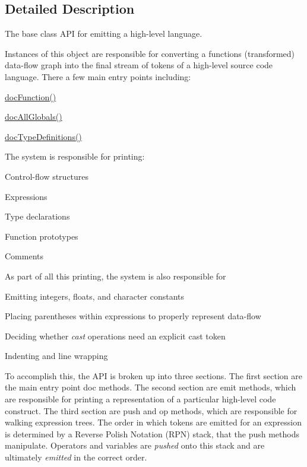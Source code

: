 \subsection{Detailed Description}
The base class A\+PI for emitting a high-\/level language. 

Instances of this object are responsible for converting a function\textquotesingle{}s (transformed) data-\/flow graph into the final stream of tokens of a high-\/level source code language. There a few main entry points including\+:
\begin{DoxyItemize}
\item \mbox{\hyperlink{class_print_language_a93ebbf4cf20c65236ffca078fd5cbc21}{doc\+Function()}}
\item \mbox{\hyperlink{class_print_language_a3fbbabf7a0a2f67e02b49d895db04fa9}{doc\+All\+Globals()}}
\item \mbox{\hyperlink{class_print_language_aea8fdf499dc7cba307e6cf513ed0ccab}{doc\+Type\+Definitions()}}
\end{DoxyItemize}

The system is responsible for printing\+:
\begin{DoxyItemize}
\item Control-\/flow structures
\item Expressions
\item Type declarations
\item Function prototypes
\item Comments
\end{DoxyItemize}

As part of all this printing, the system is also responsible for
\begin{DoxyItemize}
\item Emitting integers, floats, and character constants
\item Placing parentheses within expressions to properly represent data-\/flow
\item Deciding whether {\itshape cast} operations need an explicit cast token
\item Indenting and line wrapping
\end{DoxyItemize}

To accomplish this, the A\+PI is broken up into three sections. The first section are the main entry point \textquotesingle{}doc\textquotesingle{} methods. The second section are \textquotesingle{}emit\textquotesingle{} methods, which are responsible for printing a representation of a particular high-\/level code construct. The third section are \textquotesingle{}push\textquotesingle{} and \textquotesingle{}op\textquotesingle{} methods, which are responsible for walking expression trees. The order in which tokens are emitted for an expression is determined by a Reverse Polish Notation (R\+PN) stack, that the \textquotesingle{}push\textquotesingle{} methods manipulate. Operators and variables are {\itshape pushed} onto this stack and are ultimately {\itshape emitted} in the correct order.

